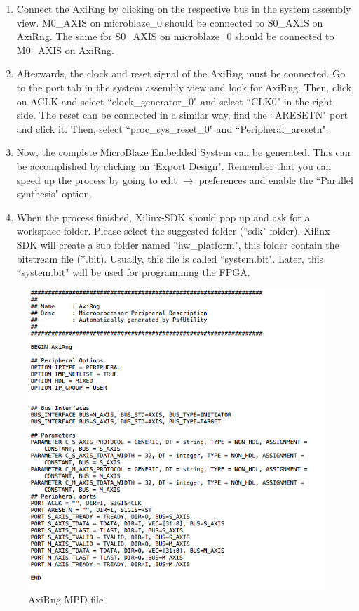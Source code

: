 \begin{enumerate}
\item Connect the AxiRng by clicking on the respective bus in the system assembly view. M0\_AXIS on microblaze\_0 should be connected to S0\_AXIS on AxiRng. The same for S0\_AXIS on microblaze\_0 should be connected to M0\_AXIS on AxiRng.
\item Afterwards, the clock and reset signal of the AxiRng must be connected. Go to the port tab in the system assembly view and look for AxiRng. Then, click on ACLK and select ``clock\_generator\_0" and select ``CLK0" in the right side. The reset can be connected in a similar way, find the ``ARESETN" port and click it. Then, select ``proc\_sys\_reset\_0" and ``Peripheral\_aresetn".
\item Now, the complete MicroBlaze Embedded System can be generated. This can be accomplished by clicking on `Export Design". Remember that you can speed up the process by going to edit $\rightarrow$ preferences and enable the ``Parallel synthesis" option. 
\item When the process finished, Xilinx-SDK should pop up and ask for a workspace folder. Please select the suggested folder (``sdk" folder). Xilinx-SDK will create a sub folder named ``hw\_platform", this folder contain the bitstream file (*.bit). Usually, this file is called ``system.bit". Later, this ``system.bit" will be used for programming the FPGA.
\end{enumerate}

\begin{figure}[!h]
\includegraphics[scale=0.75]{images/axiMpd.png}
\caption{AxiRng MPD file}
\label{f6}
\end{figure}

